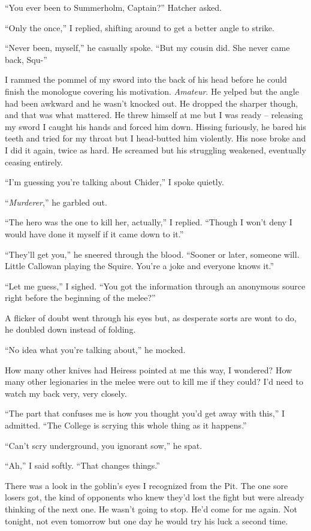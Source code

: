 \documentclass[12pt, openany]{book}
\begin{document}
“You ever been to Summerholm, Captain?” Hatcher asked.

“Only the once,” I replied, shifting around to get a better angle to strike.

“Never been, myself,” he casually spoke. “But my cousin did. She never came back, Squ-”

I rammed the pommel of my sword into the back of his head before he could finish the monologue covering his motivation. \textit{Amateur}. He yelped but the angle had been awkward and he wasn’t knocked out. He dropped the sharper though, and that was what mattered. He threw himself at me but I was ready – releasing my sword I caught his hands and forced him down. Hissing furiously, he bared his teeth and tried for my throat but I head-butted him violently. His nose broke and I did it again, twice as hard. He screamed but his struggling weakened, eventually ceasing entirely.

“I’m guessing you’re talking about Chider,” I spoke quietly.

“\textit{Murderer},” he garbled out.

“The hero was the one to kill her, actually,” I replied. “Though I won’t deny I would have done it myself if it came down to it.”

“They’ll get you,” he sneered through the blood. “Sooner or later, someone will. Little Callowan playing the Squire. You’re a joke and everyone knows it.”

“Let me guess,” I sighed. “You got the information through an anonymous source right before the beginning of the melee?”

A flicker of doubt went through his eyes but, as desperate sorts are wont to do, he doubled down instead of folding.

“No idea what you’re talking about,” he mocked.

How many other knives had Heiress pointed at me this way, I wondered? How many other legionaries in the melee were out to kill me if they could? I’d need to watch my back very, very closely.

“The part that confuses me is how you thought you’d get away with this,” I admitted. “The College is scrying this whole thing as it happens.”

“Can’t scry underground, you ignorant sow,” he spat.

“Ah,” I said softly. “That changes things.”

There was a look in the goblin’s eyes I recognized from the Pit. The one sore losers got, the kind of opponents who knew they’d lost the fight but were already thinking of the next one. He wasn’t going to stop. He’d come for me again. Not tonight, not even tomorrow but one day he would try his luck a second time.
\end{document}
